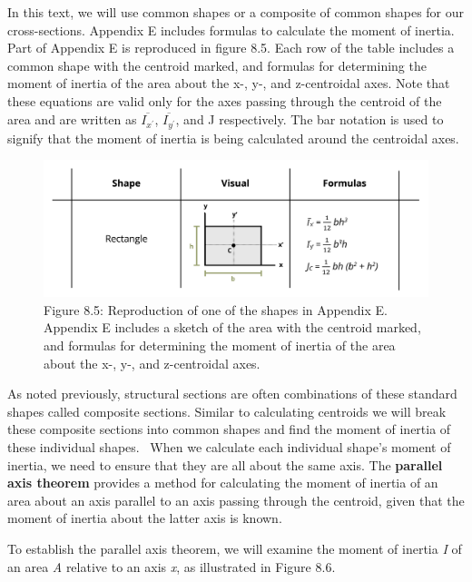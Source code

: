 \documentclass[
  letterpaper,
  DIV=11,
  numbers=noendperiod]{scrreprt}
\theoremstyle{definition}
\theoremstyle{remark}
\begin{document}
In this text, we will use common shapes or a composite of common shapes
for our cross-sections. Appendix E includes formulas to calculate the
moment of inertia. Part of Appendix E is reproduced in figure 8.5. Each
row of the table includes a common shape with the centroid marked, and
formulas for determining the moment of inertia of the area about the x-,
y-, and z-centroidal axes. Note that these equations are valid only for
the axes passing through the centroid of the area and are written as
\(\overline{I_{x^{\prime}}}\), \(\overline{I_{y^{\prime}}}\), and J
respectively. The bar notation is used to signify that the moment of
inertia is being calculated around the centroidal axes.

\begin{figure}[H]

{\centering \includegraphics{images/CH 8 PNGs/figure 8.5.png}

}

\caption{Figure 8.5: Reproduction of one of the shapes in Appendix E.
Appendix E includes a sketch of the area with the centroid marked, and
formulas for determining the moment of inertia of the area about the x-,
y-, and z-centroidal axes.}

\end{figure}%

As noted previously, structural sections are often combinations of these
standard shapes called composite sections. Similar to calculating
centroids we will break these composite sections into common shapes and
find the moment of inertia of these individual shapes.~ When we
calculate each individual shape's moment of inertia, we need to ensure
that they are all about the same axis. The \textbf{parallel axis
theorem} provides a method for calculating the moment of inertia of an
area about an axis parallel to an axis passing through the centroid,
given that the moment of inertia about the latter axis is known.

To establish the parallel axis theorem, we will examine the moment of
inertia \emph{I} of an area \emph{A} relative to an axis \emph{x}, as
illustrated in Figure 8.6.
\end{document}
